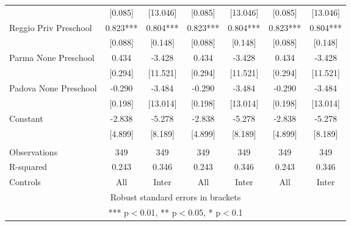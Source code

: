 \begin{tabular}{lcccccc}
 & [0.085] & [13.046] & [0.085] & [13.046] & [0.085] & [13.046] \\
Reggio Priv Preschool & 0.823*** & 0.804*** & 0.823*** & 0.804*** & 0.823*** & 0.804*** \\
 & [0.088] & [0.148] & [0.088] & [0.148] & [0.088] & [0.148] \\
Parma None Preschool & 0.434 & -3.428 & 0.434 & -3.428 & 0.434 & -3.428 \\
 & [0.294] & [11.521] & [0.294] & [11.521] & [0.294] & [11.521] \\
Padova None Preschool & -0.290 & -3.484 & -0.290 & -3.484 & -0.290 & -3.484 \\
 & [0.198] & [13.014] & [0.198] & [13.014] & [0.198] & [13.014] \\
Constant & -2.838 & -5.278 & -2.838 & -5.278 & -2.838 & -5.278 \\
 & [4.899] & [8.189] & [4.899] & [8.189] & [4.899] & [8.189] \\
 &  &  &  &  &  &  \\
Observations & 349 & 349 & 349 & 349 & 349 & 349 \\
R-squared & 0.243 & 0.346 & 0.243 & 0.346 & 0.243 & 0.346 \\
 Controls & All & Inter & All & Inter & All & Inter \\ \hline
\multicolumn{7}{c}{ Robust standard errors in brackets} \\
\multicolumn{7}{c}{ *** p$<$0.01, ** p$<$0.05, * p$<$0.1} \\
\end{tabular}
